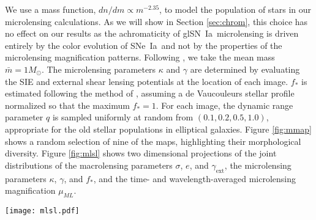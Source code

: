 \documentclass[iop,apj,numberedappendix,twocolappendix]{emulateapj}
\newcommand{\snia}{{\rm SN~Ia}}
\newcommand{\sneia}{{\rm SNe~Ia}}
\newcommand{\msun}{{\ensuremath{M_{\odot}}}}
\begin{document}
We use a \cite{salpeter} mass function, $dn/dm \propto m^{-2.35}$, to model the population of stars in our microlensing calculations.
As we will show in Section \ref{sec:chrom}, this choice has no effect on our results as the achromaticity of gl\snia\ microlensing is driven entirely by the color evolution of \sneia\ and not by the properties of the microlensing magnification patterns. 
Following \cite{dk06}, we take the mean mass $\bar{m} = 1 \msun$.
The microlensing parameters $\kappa$ and $\gamma$ are determined by evaluating the SIE and external shear lensing potentials at the  location of each image.
$f_*$ is estimated following the method of \cite{dk06}, assuming a de Vaucouleurs stellar profile normalized so that the maximum $f_* = 1$.
For each image, the dynamic range parameter $q$ is sampled uniformly at random from $(0.1, 0.2, 0.5, 1.0)$, appropriate for the old stellar populations in elliptical galaxies.
Figure \ref{fig:mmap} shows a random selection of nine of the maps, highlighting their morphological diversity. 
Figure \ref{fig:mlsl} shows two dimensional projections of the joint distributions of the macrolensing parameters $\sigma$, $e$, and $\gamma_\mathrm{ext}$, the microlensing parameters $\kappa$, $\gamma$, and $f_*$, and the time- and wavelength-averaged microlensing magnification $\mu_{ML}$. 

\begin{figure*}
	\centering
    \texttt{[image: mlsl.pdf]}
    \caption{Two-dimensional projections of the joint distributions of lensed image macrolensing and microlensing parameters.
    The input distributions (blue) represent all 78,184 simulated lensed images from Section \ref{sec:population}, and the detected distributions (red) represent only the images of the gl\sneia\ detected in Section \ref{sec:detectmc}.
    The bimodal input distributions of $f_*$, $\gamma$, and $\kappa$ represent the amplified $(f_* \approx 0.4)$ and overfocussed $(f_* \approx 1)$ images produced by SIE lenses. 
    Joint contours show 1 and 2$\sigma$. 
    Marginal shaded regions show 1$\sigma$.
    }
	\label{fig:mlsl}
\end{figure*}
\end{document}
